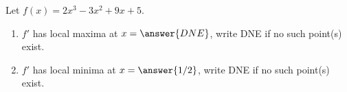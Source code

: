 \documentclass{ximera}
\author{Gregory Hartman \and Matthew Carr}
\begin{document}
\begin{exercise}






Let $f(x)=2x^3-3x^2+9x+5$.
\begin{enumerate}
\item		$f'$ has local maxima at $x=\answer{DNE}$, write DNE if no such point(s) exist.
\item		$f'$ has local minima at $x=\answer{1/2}$, write DNE if no such point(s) exist.
\end{enumerate}

\end{exercise}
\end{document}
